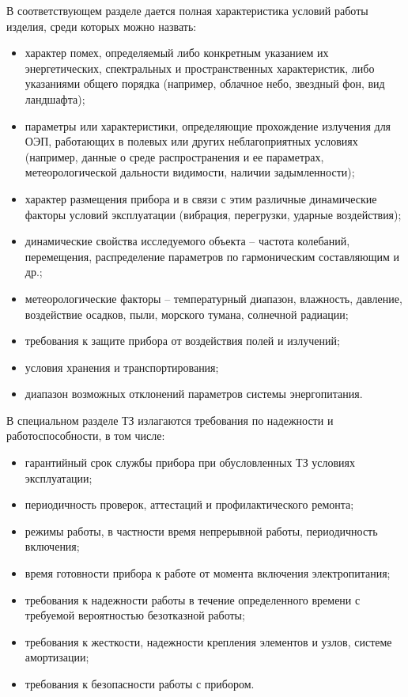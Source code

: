  
В соответствующем разделе дается полная характеристика условий работы изделия, среди которых можно назвать:
\begin{itemize}
	\item характер помех, определяемый либо конкретным указанием их энергетических, спектральных и пространственных характеристик, либо указаниями общего порядка (например, облачное небо, звездный фон, вид ландшафта);
	\item параметры или характеристики, определяющие прохождение излучения для ОЭП, работающих в полевых или других неблагоприятных условиях (например, данные о среде распространения и ее параметрах, метеорологической дальности видимости, наличии задымленности);
	\item характер размещения прибора и в связи с этим различные динамические факторы условий эксплуатации (вибрация, перегрузки, ударные воздействия);
	\item динамические свойства исследуемого объекта -- частота колебаний, перемещения, распределение параметров по гармоническим составляющим и др.;
	\item метеорологические факторы -- температурный диапазон, влажность, давление, воздействие осадков, пыли, морского тумана, солнечной радиации;
	\item требования к защите прибора от воздействия полей и излучений;
	\item условия хранения и транспортирования;
	\item диапазон возможных отклонений параметров системы энергопитания.
\end{itemize}
 
В специальном разделе ТЗ излагаются требования по надежности и работоспособности, в том числе:
\begin{itemize}
	\item гарантийный срок службы прибора при обусловленных ТЗ условиях эксплуатации;
	\item периодичность проверок, аттестаций и профилактического ремонта;
	\item режимы работы, в частности время непрерывной работы, периодичность включения;
	\item время готовности прибора к работе от момента включения электропитания;
	\item требования к надежности работы в течение определенного времени с требуемой вероятностью безотказной работы;
	\item требования к жесткости, надежности крепления элементов и узлов, системе амортизации;
	\item требования к безопасности работы с прибором.
\end{itemize}

